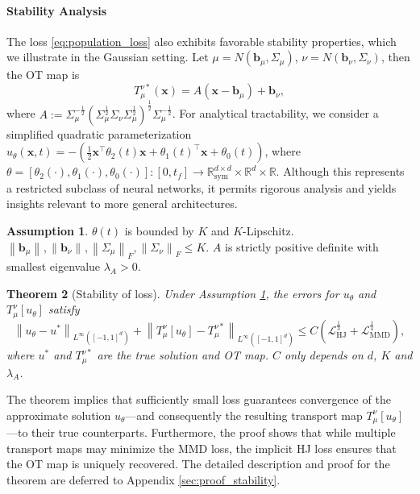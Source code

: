 \documentclass{article} %
\theoremstyle{plain}
\newtheorem{theorem}{Theorem}[section]
\theoremstyle{definition}
\newtheorem{assumption}[theorem]{Assumption}
\theoremstyle{remark}
\newcommand{\R}{\mathbb{R}}
\newcommand{\norm}[2][H^s]{\left\|#2\right\|_{#1}}
\newcommand{\bx}{\mathbf{x}}
\newcommand{\bb}{\mathbf{b}}
\newcommand{\LMMD}{\mathcal{L}_{\text{MMD}}}
\newcommand{\LHJ}{\mathcal{L}_{\text{HJ}}}
\newcommand{\lam}{\lambda}
\newcommand{\tp}{^{\top}}
\newcommand{\parentheses}[1]{\left(#1\right)}
\begin{document}
\paragraph{Stability Analysis} The loss \eqref{eq:population_loss} also exhibits favorable stability properties, which we illustrate in the Gaussian setting. 
Let $\mu=N(\bb_\mu,\Sigma_\mu)$, $\nu=N(\bb_\nu,\Sigma_\nu)$, then the OT map is
\begin{equation}\label{eq:OT_Gaussian}
T^{\nu*}_{\mu}(\bx) = A(\bx-\bb_\mu) + \bb_\nu,
\end{equation}
where $A := \Sigma_\mu^{-\frac12} (\Sigma_\mu^{\frac12} \Sigma_\nu \Sigma_\mu^{\frac12})^{\frac12} \Sigma_\mu^{-\frac12}$. For analytical tractability, we consider a simplified quadratic parameterization
$u_\theta(\bx,t) = -(\frac12 \bx\tp \theta_2(t) \bx + \theta_1(t)\tp \bx + \theta_0(t))$, where $\theta = [\theta_2(\cdot), \theta_1(\cdot), \theta_0(\cdot)]:[0,t_f] \to \R^{d\times d}_{\text{sym}} \times \R^d \times \R$. Although this represents a restricted subclass of neural networks, it permits rigorous analysis and yields insights relevant to more general architectures.
\begin{assumption}\label{assump:bound}
$\theta(t)$ is bounded by $K$ and $K$-Lipschitz. $\norm[]{\bb_\mu},\norm[]{\bb_\nu},\norm[F]{\Sigma_\mu}, \norm[F]{\Sigma_\nu} \le K$. $A$ is strictly positive definite with smallest eigenvalue $\lam_A > 0$.
\end{assumption}
\begin{theorem}[Stability of loss]\label{thm:stability}
Under Assumption \ref{assump:bound}, the errors for $u_\theta$ and $T_\mu^\nu[u_\theta]$ satisfy
\begin{equation}\label{eq:main_result}
\norm[L^{\infty}({[-1,1]^d})]{u_\theta-u^*} + \norm[L^\infty({[-1,1]^d})]{T^\nu_\mu[u_\theta]-T^{\nu*}_\mu} \le C \parentheses{ \LHJ^{\frac13} + \LMMD^{\frac14}},
\end{equation}
where $u^*$ and $T^{\nu*}_\mu$ are the true solution and OT map. $C$ only depends on $d$, $K$ and $\lam_A$.
\end{theorem}
The theorem implies that sufficiently small loss guarantees convergence of the approximate solution $u_\theta$—and consequently the resulting transport map $T_\mu^\nu[u_\theta]$—to their true counterparts. Furthermore, the proof shows that while multiple transport maps may minimize the MMD loss, the implicit HJ loss ensures that the OT map is uniquely recovered. The detailed description and proof for the theorem are deferred to Appendix \ref{sec:proof_stability}.
\end{document}

